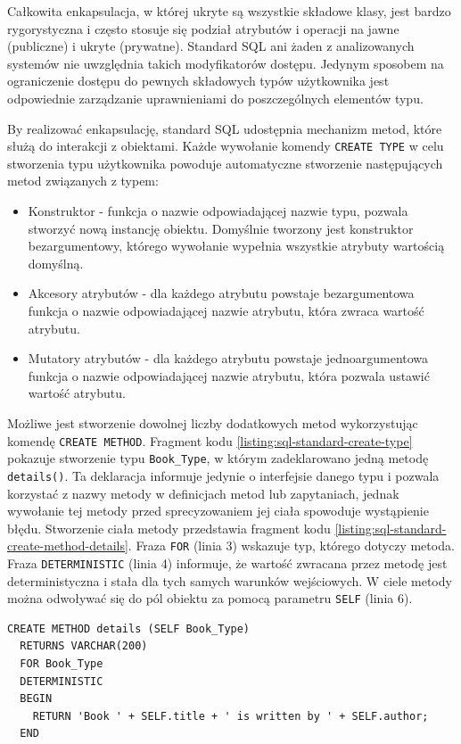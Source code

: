 \documentclass[a4paper,twoside,12pt]{book}
\begin{document}
Całkowita enkapsulacja, w której ukryte są wszystkie składowe klasy, jest bardzo rygorystyczna i często stosuje się podział atrybutów i operacji na jawne (publiczne) i ukryte (prywatne). Standard SQL ani żaden z analizowanych systemów nie uwzględnia takich modyfikatorów dostępu. Jedynym sposobem na ograniczenie dostępu do pewnych składowych typów użytkownika jest odpowiednie zarządzanie uprawnieniami do poszczególnych elementów typu.

By realizować enkapsulację, standard SQL udostępnia mechanizm metod, które służą do interakcji z obiektami. Każde wywołanie komendy \lstinline{CREATE TYPE} w celu stworzenia typu użytkownika powoduje automatyczne stworzenie następujących metod związanych z typem:
\begin{itemize}
\item Konstruktor - funkcja o nazwie odpowiadającej nazwie typu, pozwala stworzyć nową instancję obiektu. Domyślnie tworzony jest konstruktor bezargumentowy, którego wywołanie wypełnia wszystkie atrybuty wartością domyślną.
\item Akcesory atrybutów - dla każdego atrybutu powstaje bezargumentowa funkcja o nazwie odpowiadającej nazwie atrybutu, która zwraca wartość atrybutu.
\item Mutatory atrybutów - dla każdego atrybutu powstaje jednoargumentowa funkcja o nazwie odpowiadającej nazwie atrybutu, która pozwala ustawić wartość atrybutu.
\end{itemize}

Możliwe jest stworzenie dowolnej liczby dodatkowych metod wykorzystując komendę \lstinline{CREATE METHOD}. Fragment kodu \ref{listing:sql-standard-create-type} pokazuje stworzenie typu \lstinline{Book_Type}, w którym zadeklarowano jedną metodę \lstinline{details()}. Ta deklaracja informuje jedynie o interfejsie danego typu i pozwala korzystać z nazwy metody w definicjach metod lub zapytaniach, jednak wywołanie tej metody przed sprecyzowaniem jej ciała spowoduje wystąpienie błędu. Stworzenie ciała metody przedstawia fragment kodu \ref{listing:sql-standard-create-method-details}. Fraza \lstinline{FOR} (linia 3) wskazuje typ, którego dotyczy metoda. Fraza \lstinline{DETERMINISTIC} (linia 4) informuje, że wartość zwracana przez metodę jest deterministyczna i stała dla tych samych warunków wejściowych. W ciele metody można odwoływać się do pól obiektu za pomocą parametru \lstinline{SELF} (linia 6).

\begin{lstlisting}[style=SQL, caption={Definicja ciała metody według standardu SQL.}, label={listing:sql-standard-create-method-details}, captionpos=b]
CREATE METHOD details (SELF Book_Type)
  RETURNS VARCHAR(200)
  FOR Book_Type
  DETERMINISTIC
  BEGIN
    RETURN 'Book ' + SELF.title + ' is written by ' + SELF.author;
  END
\end{lstlisting}
\end{document}
